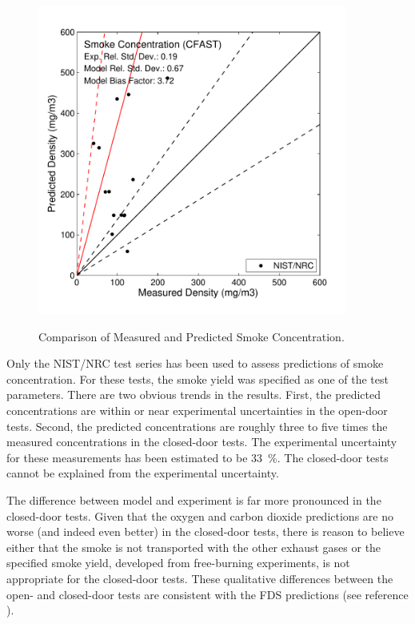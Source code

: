 \begin{figure}
\begin{center}
\includegraphics[width=4.0in]{FIGURES/ScatterPlots/Smoke_Concentration}  \\
\end{center}
\caption{Comparison of Measured and Predicted Smoke Concentration.} \label{fig:Smoke_Scatter}
\end{figure}

Only the NIST/NRC test series has been used to assess predictions of smoke concentration.  For these tests, the smoke yield was specified as one of the test parameters.  There are two obvious trends in the results.  First, the predicted concentrations are within or near experimental uncertainties in the open-door tests.  Second, the predicted concentrations are roughly three to five times the measured concentrations in the closed-door tests.  The experimental uncertainty for these measurements has been estimated to be 33~\%.  The closed-door tests cannot be explained from the experimental uncertainty.

The difference between model and experiment is far more pronounced in the closed-door tests.  Given that the oxygen and carbon dioxide predictions are no worse (and indeed even better) in the closed-door tests, there is reason to believe either that the smoke is not transported with the other exhaust gases or the specified smoke yield, developed from free-burning experiments, is not appropriate for the closed-door tests.  These qualitative differences between the open- and closed-door tests are consistent with the FDS predictions (see reference \cite{NRCNUREG1824}).

